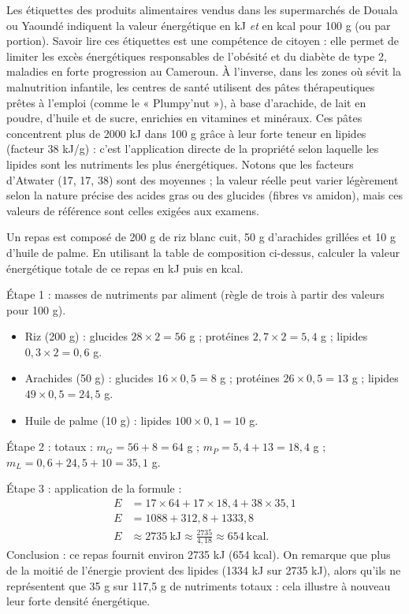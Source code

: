 \documentclass[11pt]{article}
\begin{document}
\begin{savaistu}
Les étiquettes des produits alimentaires vendus dans les supermarchés de Douala ou Yaoundé indiquent la valeur énergétique en kJ \emph{et} en kcal pour 100 g (ou par portion). Savoir lire ces étiquettes est une compétence de citoyen : elle permet de limiter les excès énergétiques responsables de l'obésité et du diabète de type 2, maladies en forte progression au Cameroun. À l'inverse, dans les zones où sévit la malnutrition infantile, les centres de santé utilisent des pâtes thérapeutiques prêtes à l'emploi (comme le « Plumpy'nut »\textregistered), à base d'arachide, de lait en poudre, d'huile et de sucre, enrichies en vitamines et minéraux. Ces pâtes concentrent plus de 2000 kJ dans 100 g grâce à leur forte teneur en lipides (facteur 38 kJ/g) : c'est l'application directe de la propriété selon laquelle les lipides sont les nutriments les plus énergétiques. Notons que les facteurs d'Atwater (17, 17, 38) sont des moyennes ; la valeur réelle peut varier légèrement selon la nature précise des acides gras ou des glucides (fibres vs amidon), mais ces valeurs de référence sont celles exigées aux examens.
\end{savaistu}

\begin{exercice}
Un repas est composé de 200 g de riz blanc cuit, 50 g d'arachides grillées et 10 g d'huile de palme. En utilisant la table de composition ci-dessus, calculer la valeur énergétique totale de ce repas en kJ puis en kcal.
\end{exercice}

\begin{corrige}
Étape 1 : masses de nutriments par aliment (règle de trois à partir des valeurs pour 100 g).
\begin{itemize}
\item Riz (200 g) : glucides $28 \times 2 = 56$ g ; protéines $2{,}7 \times 2 = 5{,}4$ g ; lipides $0{,}3 \times 2 = 0{,}6$ g.
\item Arachides (50 g) : glucides $16 \times 0{,}5 = 8$ g ; protéines $26 \times 0{,}5 = 13$ g ; lipides $49 \times 0{,}5 = 24{,}5$ g.
\item Huile de palme (10 g) : lipides $100 \times 0{,}1 = 10$ g.
\end{itemize}
Étape 2 : totaux : $m_G = 56 + 8 = 64$ g ; $m_P = 5{,}4 + 13 = 18{,}4$ g ; $m_L = 0{,}6 + 24{,}5 + 10 = 35{,}1$ g.

Étape 3 : application de la formule :
\begin{align*}
E &= 17 \times 64 + 17 \times 18{,}4 + 38 \times 35{,}1 \\
E &= 1088 + 312{,}8 + 1333{,}8 \\
E &\approx 2735~\text{kJ} \approx \frac{2735}{4{,}18} \approx 654~\text{kcal}.
\end{align*}
Conclusion : ce repas fournit environ 2735 kJ (654 kcal). On remarque que plus de la moitié de l'énergie provient des lipides (1334 kJ sur 2735 kJ), alors qu'ils ne représentent que 35 g sur 117,5 g de nutriments totaux : cela illustre à nouveau leur forte densité énergétique.
\end{corrige}
\end{document}
